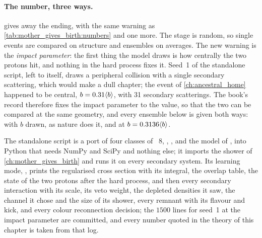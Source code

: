 \paragraph{The number, three ways.}
\label{sec:uninvited_cousins:validation}
\label{sec:uninvited_cousins:standalone_code}
 gives away the ending, with the same
warning as \cref{tab:mother_gives_birth:numbers} and one more. The stage is
random, so single events are compared on structure and ensembles on
averages. The new warning is the \emph{impact parameter}: the first thing
the model draws is how centrally the two protons hit, and nothing in the
hard process fixes it. Seed~1 of the standalone script, left to itself,
draws a peripheral collision with a single secondary scattering, which would
make a dull chapter; the \CMSSW event of \cref{ch:ancestral_home} happened to
be central, $b=0.31\langle b\rangle$, with 31 secondary scatterings. The book's record
therefore fixes the impact parameter to the \CMSSW value, so that the two
can be compared at the same geometry, and every ensemble below is given both
ways: with $b$ drawn, as nature does it, and at $b=0.3136\langle b\rangle$.

The standalone script is a port of four classes of \PYTHIA~8,
, ,  and
the  model of , into Python
that needs NumPy and SciPy and nothing else; it imports the shower of
\cref{ch:mother_gives_birth} and runs it on every secondary system. Its
learning mode, , prints the regularised cross section with its
integral, the overlap table, the state of the two protons after the hard
process, and then every secondary interaction with its scale, its veto
weight, the depleted densities it saw, the channel it chose and the size of
its shower, every remnant with its flavour and kick, and every colour
reconnection decision; the $1500$ lines for seed~1 at the \CMSSW impact
parameter are committed, and every number quoted in the theory of this
chapter is taken from that log.
\label{sec:uninvited_cousins:pythia}

